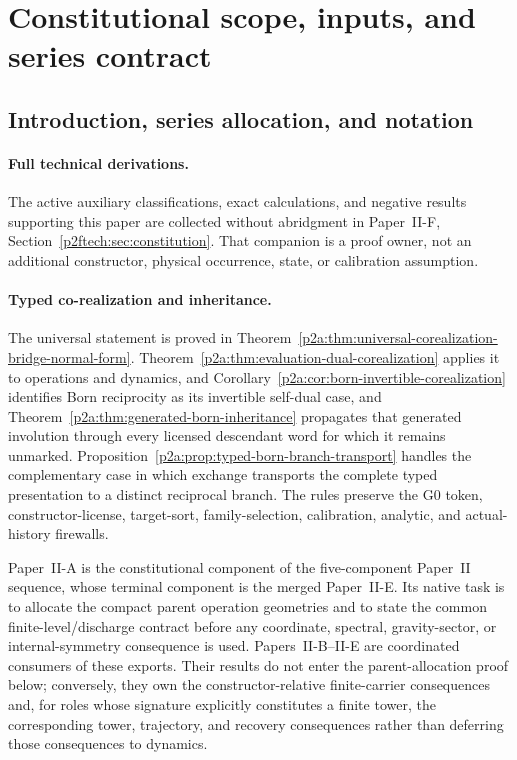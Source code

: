 \documentclass[12pt,a4paper]{article}
\begin{document}
\tableofcontents
\newpage

\section{Constitutional scope, inputs, and series contract}
\label{paper2a:sec:organized-scope}

\subsection{Introduction, series allocation, and notation}
\label{p2a:sec:introduction}

\paragraph{Full technical derivations.}
The active auxiliary classifications, exact calculations, and negative
results supporting this paper are collected without abridgment in
Paper~II-F, Section~\ref{p2ftech:sec:constitution}.
That companion is a proof owner, not an additional constructor,
physical occurrence, state, or calibration assumption.

\paragraph{Typed co-realization and inheritance.}
The universal statement is proved in
Theorem~\ref{p2a:thm:universal-corealization-bridge-normal-form}.
Theorem~\ref{p2a:thm:evaluation-dual-corealization} applies it to operations
and dynamics, and
Corollary~\ref{p2a:cor:born-invertible-corealization} identifies Born
reciprocity as its invertible self-dual case, and
Theorem~\ref{p2a:thm:generated-born-inheritance} propagates that generated
involution through every licensed descendant word for which it remains
unmarked.  Proposition~\ref{p2a:prop:typed-born-branch-transport} handles the
complementary case in which exchange transports the complete typed
presentation to a distinct reciprocal branch.  The rules preserve the G0
token, constructor-license, target-sort, family-selection, calibration,
analytic, and actual-history firewalls.


Paper~II-A is the constitutional component of the five-component Paper~II
sequence, whose terminal component is the merged Paper~II-E.  Its native
task is to allocate the compact parent operation geometries and to state the
common finite-level/discharge contract before any coordinate, spectral,
gravity-sector, or internal-symmetry consequence is used.  Papers~II-B--II-E
are coordinated consumers of these exports.  Their results do not enter the
parent-allocation proof below; conversely, they own
the constructor-relative finite-carrier consequences and, for roles whose
signature explicitly constitutes a finite tower, the corresponding tower,
trajectory, and recovery consequences rather than deferring those consequences
to dynamics.
\end{document}

